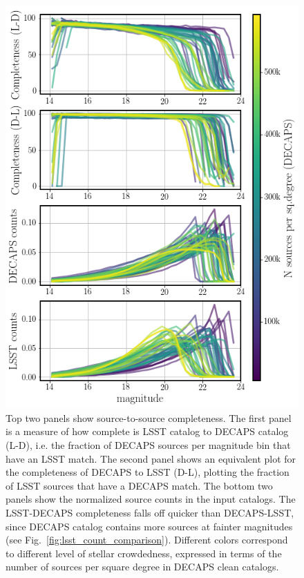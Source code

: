 \documentclass[DM,lsstdraft,toc,usenatbib]{lsstdoc}
\begin{document}
\begin{figure}
\begin{centering}
\includegraphics[width=0.75\columnwidth]{figs/completeness_4_panels_nomarker.png}
\caption{Top two panels show source-to-source completeness.  The first panel is a measure of how complete is LSST catalog to DECAPS catalog (L-D),  i.e. the fraction of DECAPS sources per magnitude bin that have an LSST match.   The second panel shows an equivalent plot for the completeness of DECAPS to LSST (D-L), plotting the fraction of LSST sources that have a DECAPS match.  The bottom two panels show the normalized source counts  in the input catalogs. The LSST-DECAPS completeness falls off quicker than DECAPS-LSST, since DECAPS catalog contains more sources at fainter magnitudes (see Fig.~\ref{fig:lsst_count_comparison}). Different colors correspond to different level of stellar crowdedness, expressed in terms of the number of sources per square degree in DECAPS clean catalogs.}
\label{fig:completeness}
\end{centering}
\end{figure} 
\end{document}
